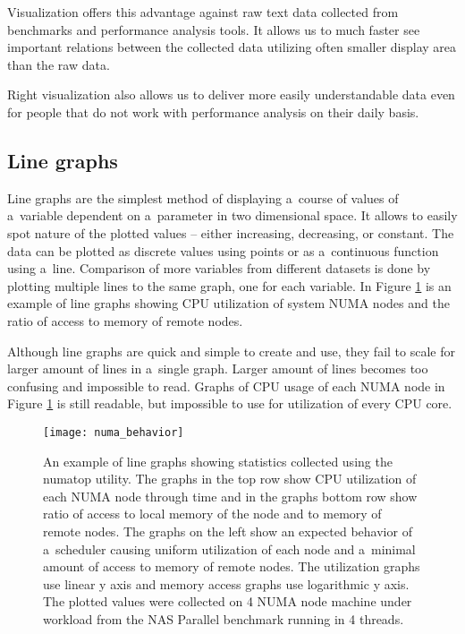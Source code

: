 Visualization offers this advantage against raw text data collected from
benchmarks and performance analysis tools. It allows us to much faster see
important relations between the collected data utilizing often smaller display area
than the raw data.

Right visualization also allows us to deliver more easily understandable data even
for people that do not work with performance analysis on their daily basis.

\subsection{Line graphs}
Line graphs are the simplest method of displaying a~course of values of a~variable
dependent on a~parameter in two dimensional space. It allows to easily spot
nature of the plotted values -- either increasing, decreasing, or constant. The
data can be plotted as discrete values using points or as a~continuous function
using a~line. Comparison of more variables from different datasets is done by
plotting multiple lines to the same graph, one for each variable. In Figure
\ref{fig:linegraph} is an example of line graphs showing CPU utilization of system
NUMA nodes and the ratio of access to memory of remote nodes.

Although line graphs are quick and simple to create and use, they fail to scale
for larger amount of lines in a~single graph. Larger amount of lines becomes too
confusing and impossible to read. Graphs of CPU usage of each NUMA node in
Figure \ref{fig:linegraph} is still readable, but impossible to use for
utilization of every CPU core.

\begin{figure}
  \centering
  \texttt{[image: numa\_behavior]}
  \caption{An example of line graphs showing statistics collected using the numatop
    utility. The graphs in the top row show CPU utilization of each NUMA node
    through time and in the graphs bottom row show ratio of access to local memory of
    the node and to memory of remote nodes. The graphs on the left show an expected
    behavior of a~scheduler causing uniform utilization of each node and a~minimal
    amount of access to memory of remote nodes. The utilization graphs use
    linear y axis and memory access graphs use logarithmic y axis. The plotted
    values were collected on 4 NUMA node machine under workload from the NAS
    Parallel benchmark running in 4 threads.}
  \label{fig:linegraph}
\end{figure}

